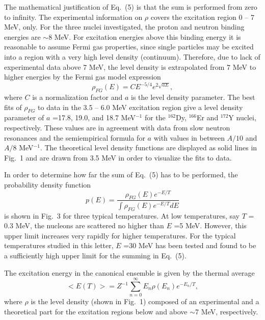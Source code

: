 The mathematical justification of Eq.~(5) is that the sum is performed from
zero to infinity. The experimental information on $\rho$ covers the
excitation region 0 -- 7 MeV, only. For the three nuclei investigated, the
proton and neutron binding energies are $\sim$8 MeV. For excitation
energies above this binding energy it is reasonable to assume Fermi gas
properties, since single particles may be excited into a region with a very
high level density (continuum). Therefore, due to lack of experimental data
above 7 MeV, the level density is extrapolated from 7 MeV to higher
energies by the Fermi gas model expression \cite{14} \begin{equation}
\rho_{\scriptscriptstyle {FG}}(E)=CE^{-5/4}e^{2 \sqrt{aE}}, \end{equation}
where $C$ is a normalization factor and $a$ is the level density parameter.
The best fits of $\rho_{\scriptscriptstyle {FG}}$ to data in the 3.5 -- 6.0
MeV excitation region give a level density parameter of $a$ =17.8, 19.0,
and 18.7 MeV$^{-1}$ for the $^{162}$Dy, $^{166}$Er and $^{172}$Y nuclei,
respectively. These values are in agreement with data from slow neutron
resonances \cite{2} and the semiempirical formula for $a$ with values in
between $A/10$ and $A/8$ MeV$^{-1}$. The theoretical level density
functions are displayed as solid lines in Fig.~1 and are drawn from 3.5 MeV
in order to visualize the fits to data.


In order to determine how far the sum of Eq.~(5) has to be performed, the
probability density function
\begin{equation}
p (E)=\frac{\rho_{\scriptscriptstyle {FG}} (E)e^{-E/T}}
{\int{\rho_{\scriptscriptstyle {FG}}
(E)e^{-E/T}dE}}
\end{equation}
is shown in Fig.~3 for three typical temperatures. At low temperatures, say
$T$ = 0.3 MeV, the nucleons are scattered no higher than $E$ =5 MeV.
However, this upper limit increases very rapidly for higher temperatures.
For the typical temperatures studied in this letter, $E$ =30 MeV has been
tested and found to be a sufficiently high upper limit for the summing in
Eq.~(5).

The excitation energy in the canonical
ensemble is given by the thermal average \begin{equation}
<E(T)>=Z^{-1}\sum_{n=0}^{\infty}E_n\rho (E_n)e^{-E_n/T}, \end{equation}
where $\rho$ is the level density (shown in Fig.~1) composed of an
experimental and a theoretical part for the excitation regions below and
above $\sim$7 MeV, respectively.

